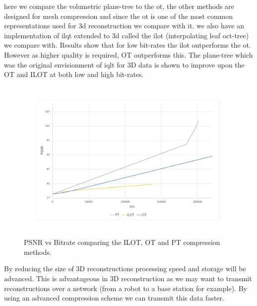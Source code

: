 here we compare the volumetric plane-tree to the ot, the other methods are designed for mesh compression and since the ot is one of the most common representations used for 3d reconstruction we compare with it. we also have an implementation of ilqt extended to 3d called the ilot (interpolating leaf oct-tree) we compare with. Results show that for low bit-rates the ilot outperforms the ot. However as higher quality is required, OT outperforms this. The plane-tree which was the original envisionment of iqlt for 3D data is shown to improve upon the OT and ILOT at both low and high bit-rates. \\

\begin{figure}[t]
\centering
\includegraphics[width=6.0in]{images/results/compression/psnr1}
\caption{PSNR vs Bitrate comparing the ILOT, OT and PT compression methods.}
\label{fig:PSNR1}
\end{figure}

By reducing the size of 3D reconstructions processing speed and storage will be advanced. This is advantageous in 3D reconstruction as we may want to transmit reconstructions over a network (from a robot to a base station for example). By using an advanced compression scheme we can transmit this data faster. 